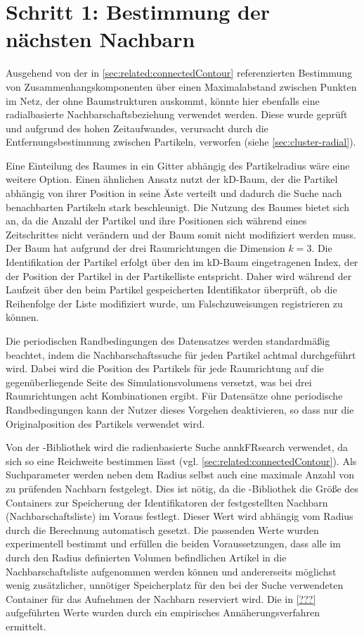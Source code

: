 \section{Schritt 1: Bestimmung der nächsten Nachbarn}\label{sec:nachbarschaftssuche}

Ausgehend von der in \autoref{sec:related:connectedContour} referenzierten Bestimmung von Zusammenhangskomponenten über einen Maximalabstand zwischen Punkten im Netz, der ohne Baumstrukturen auskommt, könnte hier ebenfalls eine radialbasierte Nachbarschaftsbeziehung verwendet werden. Diese wurde geprüft und aufgrund des hohen Zeitaufwandes, verursacht durch die Entfernungsbestimmung zwischen Partikeln, verworfen (siehe \autoref{sec:cluster-radial}).

Eine Einteilung des Raumes in ein Gitter abhängig des Partikelradius wäre eine weitere Option. Einen ähnlichen Ansatz nutzt der kD-Baum, der die Partikel abhängig von ihrer Position in seine Äste verteilt und dadurch die Suche nach benachbarten Partikeln stark beschleunigt. Die Nutzung des Baumes bietet sich an, da die Anzahl der Partikel und ihre Positionen sich während eines Zeitschrittes nicht verändern und der Baum somit nicht modifiziert werden muss. Der Baum hat aufgrund der drei Raumrichtungen die Dimension $k=3$. Die Identifikation der Partikel erfolgt über den im kD-Baum eingetragenen Index, der der Position der Partikel in der Partikelliste entspricht. Daher wird während der Laufzeit über den beim Partikel gespeicherten Identifikator überprüft, ob die Reihenfolge der Liste modifiziert wurde, um Falschzuweisungen registrieren zu können.

Die periodischen Randbedingungen des Datensatzes werden standardmäßig beachtet, indem die Nachbarschaftssuche für jeden Partikel achtmal durchgeführt wird. Dabei wird die Position des Partikels für jede Raumrichtung auf die gegenüberliegende Seite des Simulationsvolumens versetzt, was bei drei Raumrichtungen acht Kombinationen ergibt.
Für Datensätze ohne periodische Randbedingungen kann der Nutzer dieses Vorgehen deaktivieren, so dass nur die Originalposition des Partikels verwendet wird.

Von der -Bibliothek wird die radienbasierte Suche annkFRsearch verwendet, da sich so eine Reichweite bestimmen lässt (vgl. \autoref{sec:related:connectedContour}). Als Suchparameter werden neben dem Radius selbst auch eine maximale Anzahl von zu prüfenden Nachbarn festgelegt. Dies ist nötig, da die -Bibliothek die Größe des Containers zur Speicherung der Identifikatoren der festgestellten Nachbarn (Nachbarschaftsliste) im Voraus festlegt. Dieser Wert wird abhängig vom Radius durch die Berechnung automatisch gesetzt. Die passenden Werte wurden experimentell bestimmt und erfüllen die beiden Voraussetzungen, dass alle im durch den Radius definierten Volumen befindlichen Artikel in die Nachbarschaftsliste aufgenommen werden können und andererseits möglichst wenig zusätzlicher, unnötiger Speicherplatz für den bei der Suche verwendeten Container für das Aufnehmen der Nachbarn reserviert wird. Die in \autoref{???} aufgeführten Werte wurden durch ein empirisches Annäherungsverfahren ermittelt. %

